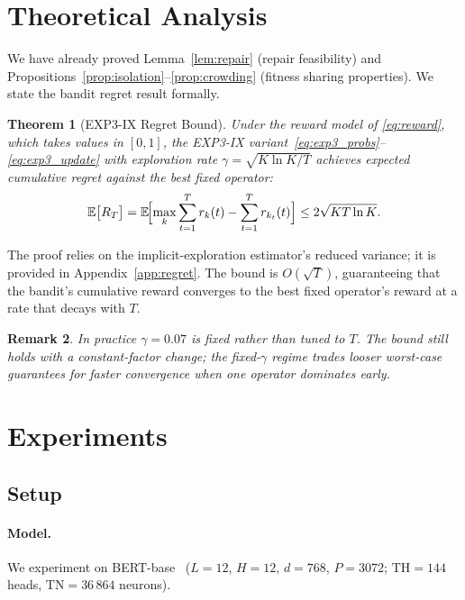 \documentclass{article}
\newtheorem{theorem}{Theorem}[section]
\newtheorem{remark}[theorem]{Remark}
\newcommand{\E}{\mathbb{E}}
\begin{document}
\section{Theoretical Analysis}
\label{sec:theory}

We have already proved Lemma~\ref{lem:repair} (repair feasibility) and
Propositions~\ref{prop:isolation}--\ref{prop:crowding} (fitness
sharing properties).  We state the bandit regret result formally.

\begin{theorem}[EXP3-IX Regret Bound]
\label{thm:regret}
Under the reward model of \eqref{eq:reward}, which takes values in
$[0,1]$, the EXP3-IX variant~\eqref{eq:exp3_probs}--\eqref{eq:exp3_update}
with exploration rate $\gamma = \sqrt{K\ln K / T}$ achieves expected
cumulative regret against the best fixed operator:
\begin{equation}
  \E\bigl[R_T\bigr]
  = \E\!\Bigl[\max_k\sum_{t=1}^T r_k(t) - \sum_{t=1}^T r_{k_t}(t)\Bigr]
  \le 2\sqrt{KT\ln K}.
  \label{eq:regret_thm}
\end{equation}
\end{theorem}

The proof relies on the implicit-exploration estimator's reduced
variance; it is provided in Appendix~\ref{app:regret}.
The bound is $O(\sqrt{T})$, guaranteeing that the bandit's
cumulative reward converges to the best fixed operator's reward at
a rate that decays with $T$.

\begin{remark}
In practice $\gamma=0.07$ is fixed rather than tuned to $T$.  The
bound still holds with a constant-factor change; the fixed-$\gamma$
regime trades looser worst-case guarantees for faster convergence
when one operator dominates early.
\end{remark}

\section{Experiments}
\label{sec:experiments}

\subsection{Setup}

\paragraph{Model.}
We experiment on BERT-base~\citep{devlin2019bert}
($L=12$, $H=12$, $d=768$, $P=3072$; $\mathrm{TH}=144$ heads,
$\mathrm{TN}=36\,864$ neurons).
\end{document}
